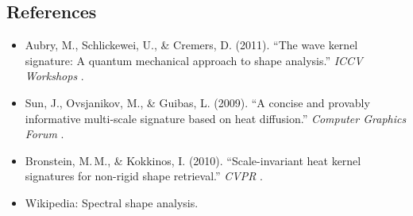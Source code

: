 \subsection{References}
\begin{itemize}
  \item Aubry, M., Schlickewei, U., \& Cremers, D. (2011). ``The wave kernel signature: A quantum mechanical approach to shape analysis.'' \textit{ICCV Workshops} \cite{aubry2011}.
  \item Sun, J., Ovsjanikov, M., \& Guibas, L. (2009). ``A concise and provably informative multi-scale signature based on heat diffusion.'' \textit{Computer Graphics Forum} \cite{sun2009}.
  \item Bronstein, M.\,M., \& Kokkinos, I. (2010). ``Scale-invariant heat kernel signatures for non-rigid shape retrieval.'' \textit{CVPR} \cite{bronstein2010}.
  \item Wikipedia: Spectral shape analysis.
\end{itemize}
